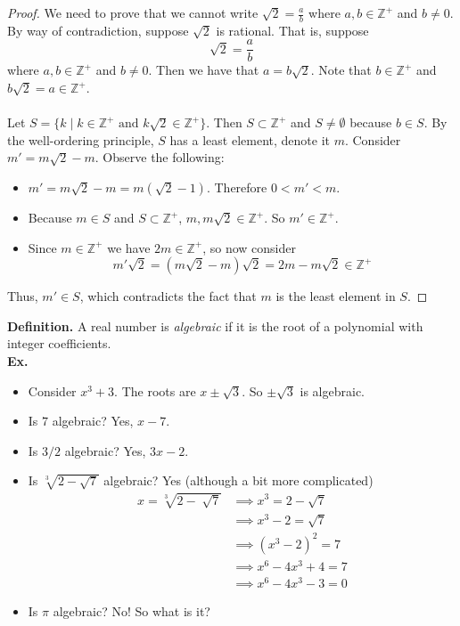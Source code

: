 \documentclass[class=article, crop=false]{standalone}
\begin{document}
\begin{proof}
	We need to prove that we cannot write $\sqrt{2}=\frac{a}{b}$ where $a,b\in\mathbb{Z}^+$ and $b\neq 0$.
	By way of contradiction, suppose $\sqrt{2}$ is rational. That is, suppose $$\sqrt{2} = \frac{a}{b}$$
	where $a,b\in\mathbb{Z}^+$ and $b\neq 0$. Then we have that $a=b\sqrt{2}$. Note that $b\in\mathbb{Z}^+$ and $b\sqrt{2}=a\in\mathbb{Z}^+$.\\\\
	Let $S = \{k \mid k\in\mathbb{Z}^+ \text{ and } k\sqrt{2}\in\mathbb{Z}^+\}$. Then $S \subset \mathbb{Z}^+$ and $S\neq \emptyset$ because
	$b\in S$. By the well-ordering principle, $S$ has a least element, denote it $m$. Consider $m' = m\sqrt{2}-m$.
	Observe the following:
	\begin{itemize}
		\item $m' = m\sqrt{2}-m = m(\sqrt{2}-1)$. Therefore $0 < m' < m$.
		\item Because $m\in S$ and $S\subset \mathbb{Z}^+$, $m, m\sqrt{2}\in\mathbb{Z}^+$. So $m'\in\mathbb{Z}^+$.
		\item Since $m \in \mathbb{Z}^+$ we have $2m\in\mathbb{Z}^+$, so now consider 
		$$m'\sqrt{2}=(m\sqrt{2}-m)\sqrt{2}=2m-m\sqrt{2} \in\mathbb{Z}^+$$
	\end{itemize}
	Thus, $m'\in S$, which contradicts the fact that $m$ is the least element in $S$. 
\end{proof}
\noindent\textbf{Definition.} A real number is \emph{algebraic} if it is the root of a polynomial with integer coefficients.\\
\textbf{Ex.} 
	\begin{itemize}
		\item Consider $x^3 + 3$. The roots are $x\pm \sqrt{3}$. So $\pm\sqrt{3}$ is algebraic.
		\item Is $7$ algebraic? Yes, $x-7$.
		\item Is $3/2$ algebraic? Yes, $3x-2$.
		\item Is $\sqrt[3]{2-\sqrt{7}}$ algebraic? Yes (although a bit more complicated)
			\begin{align*}
				x = \sqrt[3]{2-\sqrt[]{7}} &\implies x^3 = 2-\sqrt{7} \\
				&\implies x^3-2 = \sqrt{7} \\
				&\implies (x^3-2)^2 = 7 \\
				&\implies x^6 -4x^3+4=7 \\
				&\implies x^6 -4x^3-3=0
			\end{align*}
		\item Is $\pi$ algebraic? No! So what is it?
	\end{itemize}
\end{document}
